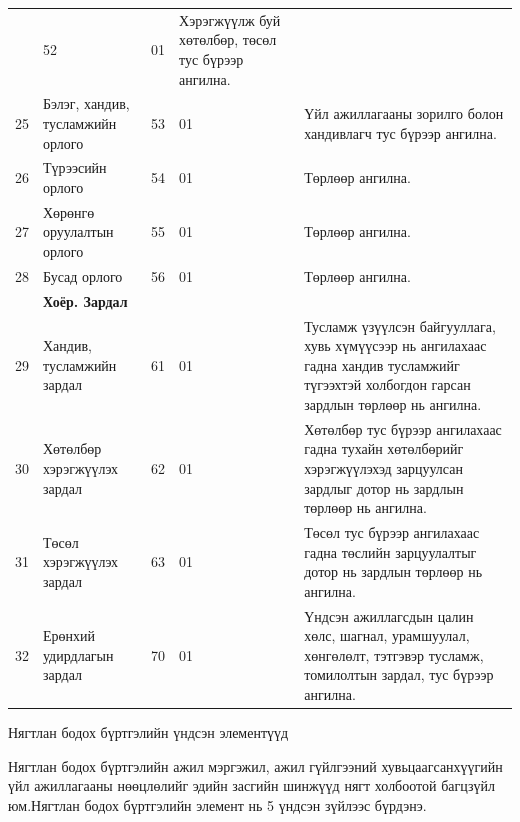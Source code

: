 {{{{{\begin{tabular}{ |p{0.5cm}||p{5cm}|p{1cm}|p{1cm}|p{4.2cm} | }
	
	& 52   &01 &Хэрэгжүүлж буй хөтөлбөр, төсөл тус бүрээр ангилна.\\
	25&Бэлэг, хандив, тусламжийн орлого
	
	
	& 53   &01 &Үйл ажиллагааны зорилго болон хандивлагч тус бүрээр ангилна.\\
	26&Түрээсийн орлого
	
	
	& 54   &01 &Төрлөөр ангилна.\\
	27&Хөрөнгө оруулалтын орлого
	
	
	& 55   &01 &Төрлөөр ангилна.\\
	
	28&Бусад орлого       
	
	
	& 56   &01 &Төрлөөр ангилна.\\
	\hline
	
	\hline
	
	&         \textbf{Хоёр. Зардал} 
	
	
	
	
	
	
	& &  & \\
	29  &	Хандив, тусламжийн зардал   &61&   01 &Тусламж үзүүлсэн байгууллага, хувь хүмүүсээр нь ангилахаас гадна хандив тусламжийг түгээхтэй холбогдон гарсан зардлын төрлөөр нь ангилна.\\
	30&  Хөтөлбөр хэрэгжүүлэх зардал
	
	
	& 62   &01 &Хөтөлбөр тус бүрээр ангилахаас гадна тухайн хөтөлбөрийг хэрэгжүүлэхэд зарцуулсан зардлыг дотор нь зардлын төрлөөр нь ангилна. \\
	31&  Төсөл хэрэгжүүлэх зардал
	
	
	& 63   &01 &Төсөл тус бүрээр ангилахаас гадна төслийн зарцуулалтыг дотор нь зардлын төрлөөр нь ангилна. \\
	32&  Ерөнхий удирдлагын зардал
	
	
	& 70   &01 &Үндсэн ажиллагсдын цалин хөлс, шагнал, урамшуулал, хөнгөлөлт, тэтгэвэр тусламж, томилолтын зардал, тус бүрээр ангилна. \\
	
	\hline

	
\end{tabular}

\vspace{0.1in}
Нягтлан бодох бүртгэлийн үндсэн элементүүд




Нягтлан бодох бүртгэлийн ажил мэргэжил, ажил гүйлгээний хувьцаагсанхүүгийн үйл ажиллагааны нөөцлөлийг эдийн засгийн шинжүүд нягт холбоотой багцзүйл юм.Нягтлан бодох бүртгэлийн элемент нь 5 үндсэн зүйлээс бүрдэнэ.


}}}}}
